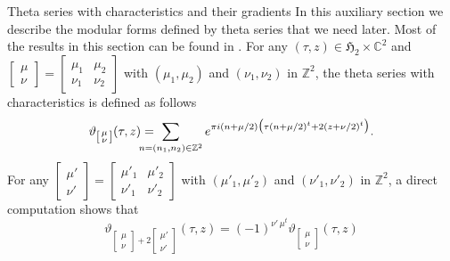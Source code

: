 \documentclass[12pt]{amsart}
\numberwithin{equation}{section}
\newcommand{\CC}{\mathbb C}
\newcommand{\ZZ}{\mathbb Z}
\numberwithin{equation}{section}
\theoremstyle{definition}
\theoremstyle{remark}
\begin{document}
\begin{section}{Theta series with characteristics and their gradients}\label{theta}
In this auxiliary section we describe the modular forms defined by theta series that we need later.
Most of the results in this section can be found in \cite[Chapter V]{IgusaBook}.
For any $(\tau,z)\in \mathfrak{H}_2\times {\CC}^2$ and
$
\left[
\begin{smallmatrix}
\mu \\ \nu
\end{smallmatrix}
\right]=
\left[
\begin{smallmatrix}
\mu_1 & \mu_2 \\ \nu_1 & \nu_2
\end{smallmatrix}
\right]
$
with $(\mu_1,\mu_2)$ and $(\nu_1,\nu_2)$ in ${\ZZ}^2$, the
theta series with characteristics is defined as follows
\begin{equation}\label{ThetaCharac}
\vartheta_{
\left[
\begin{smallmatrix}
\mu \\ \nu
\end{smallmatrix}
\right]}
(\tau,z)=\hspace{-15pt}
\sum_{n=(n_1,n_2)\in {\ZZ}^2}
e^{\pi i (n+\mu/2)
\big(
\tau (n+\mu/2)^t
+2(z+\nu/2)^t
\big)}.
\end{equation}
For any
$
\left[
\begin{smallmatrix}
\mu' \\ \nu'
\end{smallmatrix}
\right]=
\left[
\begin{smallmatrix}
\mu'_1 & \mu'_2 \\ \nu'_1 & \nu'_2
\end{smallmatrix}
\right]
$
with $(\mu'_1,\mu'_2)$ and $(\nu'_1,\nu'_2)$ in ${\ZZ}^2$, a direct computation shows that
\begin{equation}\label{AdditionCharac}
\vartheta_{
\left[
\begin{smallmatrix}
\mu \\ \nu
\end{smallmatrix}
\right]+
2\left[
\begin{smallmatrix}
\mu' \\ \nu'
\end{smallmatrix}
\right]}
(\tau,z)=(-1)^{\nu'\,\mu^t}
\vartheta_{
\left[
\begin{smallmatrix}
\mu \\ \nu
\end{smallmatrix}
\right]}
(\tau,z)

\end{equation}
\end{section}
\end{document}
